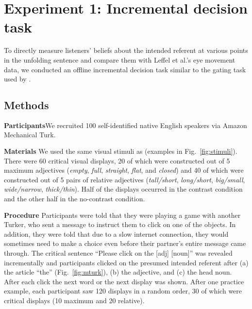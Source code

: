 \documentclass[10pt,letterpaper]{article}
\begin{document}
\section{Experiment 1: Incremental decision task}


To directly measure listeners' beliefs about the intended referent at various points in the unfolding sentence and compare them with Leffel et al.'s eye movement data, we conducted an offline incremental decision task similar to the gating task used by .

\subsection{Methods}

\noindent \textbf{Participants}\quad  We recruited 100 self-identified native English speakers via Amazon Mechanical Turk.

\noindent \textbf{Materials} \quad 
We used the same visual stimuli as  (examples in
 Fig.~\ref{fig:stimuli}).
There were 60 critical visual displays, 20 of which were constructed out of 
 5 maximum adjectives (\emph{empty}, \emph{full}, \emph{straight}, \emph{flat}, and \emph{closed}) and 
 40 of which were constructed out of 5 pairs of relative adjectives (\emph{tall/short}, \emph{long/short}, \emph{big/small}, \emph{wide/narrow}, \emph{thick/thin}).
Half of the displays occurred in the contrast condition and the other half in the no-contrast condition.

\noindent \textbf{Procedure} \quad 
Participants were told that they were playing a game with another Turker, 
 who sent a message to instruct them to click on one of the objects.
In addition, they were told that due to a slow internet connection, they would sometimes need to make a choice 
 even before their partner's entire message came through.
The critical sentence ``Please click on the [adj] [noun]'' was revealed incrementally and participants clicked on the presumed intended referent after (a) the article ``the'' (Fig.~\ref{fig:mturk}), (b) the adjective, and (c) the head noun. %
After each click the next word or the next display was shown.
After one practice example, each participant saw 120 displays in a random order, 30 of which were critical displays (10 maximum and 20 relative).
\end{document}
